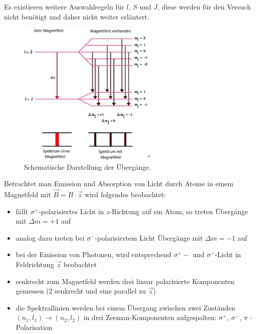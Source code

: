 Es existieren weitere Auswahlregeln für $l$, $S$ und $J$, diese werden für den Versuch nicht benötigt und daher nicht weiter erläutert.
\\
\begin{figure}
    \centering
    \includegraphics[width=0.6\textwidth]{content/data/uebergaenge_zeeman.png}
    \caption{Schematische Darstellung der Übergänge. \cite{sternspektren}} %
    \label{fig:uebergaenge}
\end{figure}
Betrachtet man Emission und Absorption von Licht durch Atome in einem Magnetfeld mit $\vec{B} = B \cdot \vec{z}$ wird folgendes beobachtet:

\begin{itemize}
    \item fällt $\sigma^+$-polarisiertes Licht in $z$-Richtung auf ein Atom, so treten Übergänge mit $\Delta m = +1$ auf
    \item analog dazu treten bei $\sigma^-$-polarisiertem Licht Übergänge mit $\Delta m = -1$ auf
    \item bei der Emission von Photonen, wird entsprechend $\sigma^+ -$ und $\sigma^-$-Licht in Feldrichtung $\vec{z}$ beobachtet
    \item senkrecht zum Magnetfeld werden drei linear polarisierte Komponenten gemessen (2 senkrecht und eine parallel zu $\vec{z}$)
    \item die Spektrallinien werden bei einem Übergang zwischen zwei Zuständen $(n_1,l_1) \rightarrow (n_2,l_2)$ in drei Zeeman-Komponenten aufgespalten: $\sigma^+$, $\sigma^-$, $\pi$ -Polarisation
\end{itemize}
\FloatBarrier

